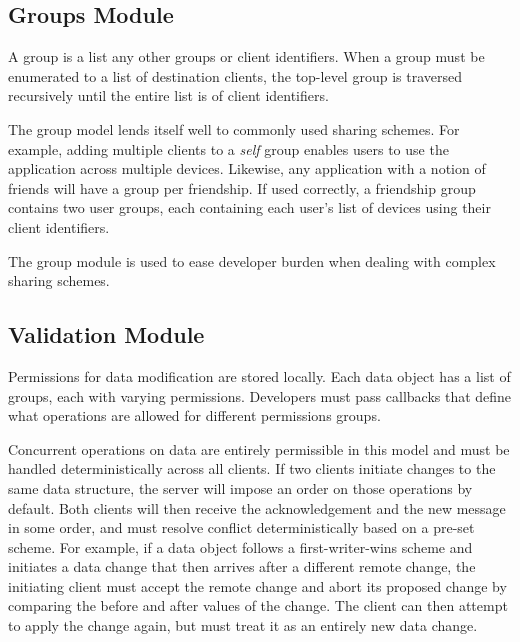\subsection{Groups Module}


A group is a list any other groups or client identifiers. When a group must be enumerated to a list of destination clients, the top-level group is traversed recursively until the entire list is of client identifiers.

The group model lends itself well to commonly used sharing schemes. For example, adding multiple clients to a \textit{self} group enables users to use the application across multiple devices. Likewise, any application with a notion of friends will have a group per friendship. If used correctly, a friendship group contains two user groups, each containing each user's list of devices using their client identifiers.

The group module is used to ease developer burden when dealing with complex sharing schemes. 

\subsection{Validation Module}
Permissions for data modification are stored locally. Each data object has a list of groups, each with varying permissions. Developers must pass callbacks that define what operations are allowed for different permissions groups. 


Concurrent operations on data are entirely permissible in this model and must be handled deterministically across all clients. If two clients initiate changes to the same data structure, the server will impose an order on those operations by default. Both clients will then receive the acknowledgement and the new message in some order, and must resolve conflict deterministically based on a pre-set scheme. For example, if a data object follows a first-writer-wins scheme and initiates a data change that then arrives after a different remote change, the initiating client must accept the remote change and abort its proposed change by comparing the before and after values of the change. The client can then attempt to apply the change again, but must treat it as an entirely new data change.

